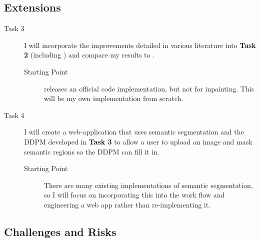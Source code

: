 \documentclass{article}
\begin{document}
\subsection{Extensions}
\begin{description}
\item[Task 3] I will incorporate the improvements detailed in various literature into \textbf{Task 2} (including \cite{Nichol-2021}) and compare my results to \cite{Saharia-2022}.
\begin{description}
\item[Starting Point] \cite{Saharia-2022} releases an official code implementation, but not for inpainting. This will be my own implementation from scratch.
\end{description}
\item[Task 4] I will create a web-application that uses semantic segmentation and the DDPM developed in \textbf{Task 3} to allow a user to upload an image and mask semantic regions so the DDPM can fill it in.
\begin{description}
\item[Starting Point] There are many existing implementations of semantic segmentation, so I will focus on incorporating this into the work flow and engineering a web app rather than re-implementing it.
\end{description}
\end{description}

\subsection{Challenges and Risks}
\end{document}
